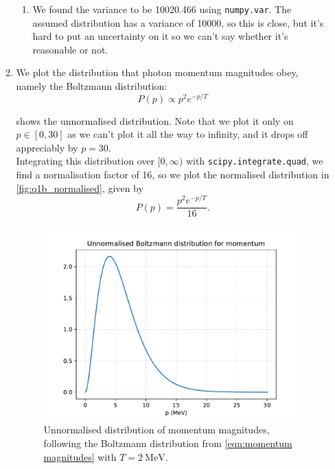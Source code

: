 \documentclass[11pt]{article}
\begin{document}
\begin{enumerate}
\begin{enumerate}
\begin{enumerate}
            \item We found the variance to be \num{10020.466} using \texttt{numpy.var}. The assumed distribution has a variance of \num{10000}, so this is close, but it's hard to put an uncertainty on it so we can't say whether it's reasonable or not.
        \end{enumerate}

        \item We plot the distribution that photon momentum magnitudes obey, namely the Boltzmann distribution:
        \begin{equation}
            P(p)\propto p^2 e^{-p/T}
            \label{eqn:momentum magnitudes}
        \end{equation}

         shows the unnormalised distribution. Note that we plot it only on $p\in[0,30]$ as we can't plot it all the way to infinity, and it drops off appreciably by $p=30$. \\
        Integrating this distribution over $[0,\infty)$ with \texttt{scipy.integrate.quad}, we find a normalisation factor of 16, so we plot the normalised distribution in \cref{fig:q1b_normalised}, given by 
        \begin{equation}
            P(p)=\frac{p^2 e^{-p/T}}{16}.
            \label{eqn:boltzmann normalised}
        \end{equation}

        \begin{figure}[H]
            \begin{center}
                \includegraphics[width=.6\textwidth]{Plots/q1b_unnormalised.pdf}
                \caption{Unnormalised distribution of momentum magnitudes, following the Boltzmann distribution from \cref{eqn:momentum magnitudes} with $T=\SI{2}{\mega\electronvolt}$. }
                \label{fig:q1b_unnormalised}
            \end{center}
        \end{figure}


\end{enumerate}
\end{enumerate}
\end{document}
